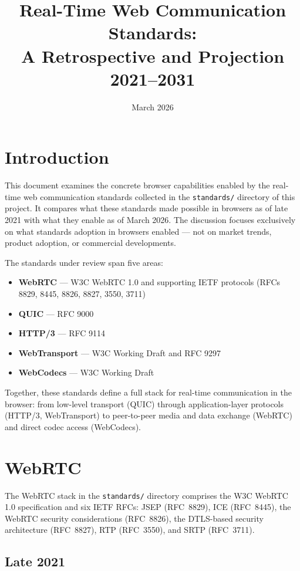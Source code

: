 \documentclass[11pt]{article}
\title{Real-Time Web Communication Standards:\\A Retrospective and Projection\\2021--2031}
\author{}
\date{March 2026}
\begin{document}
\maketitle

\tableofcontents
\listoffigures
\listoftables
\newpage

\section{Introduction}

This document examines the concrete browser capabilities enabled by the
real-time web communication standards collected in the \texttt{standards/}
directory of this project. It compares what these standards made possible in
browsers as of late 2021 with what they enable as of March 2026. The
discussion focuses exclusively on what standards adoption in browsers enabled
--- not on market trends, product adoption, or commercial developments.

The standards under review span five areas:
\begin{itemize}
  \item \textbf{WebRTC} --- W3C WebRTC 1.0 and supporting IETF protocols
    (RFCs 8829, 8445, 8826, 8827, 3550, 3711)
  \item \textbf{QUIC} --- RFC 9000
  \item \textbf{HTTP/3} --- RFC 9114
  \item \textbf{WebTransport} --- W3C Working Draft and RFC 9297
  \item \textbf{WebCodecs} --- W3C Working Draft
\end{itemize}

Together, these standards define a full stack for real-time communication in
the browser: from low-level transport (QUIC) through application-layer
protocols (HTTP/3, WebTransport) to peer-to-peer media and data exchange
(WebRTC) and direct codec access (WebCodecs).

\section{WebRTC}

The WebRTC stack in the \texttt{standards/} directory comprises the W3C
WebRTC 1.0 specification and six IETF RFCs: JSEP (RFC~8829), ICE
(RFC~8445), the WebRTC security considerations (RFC~8826), the DTLS-based
security architecture (RFC~8827), RTP (RFC~3550), and SRTP (RFC~3711).

\subsection{Late 2021}
\end{document}
